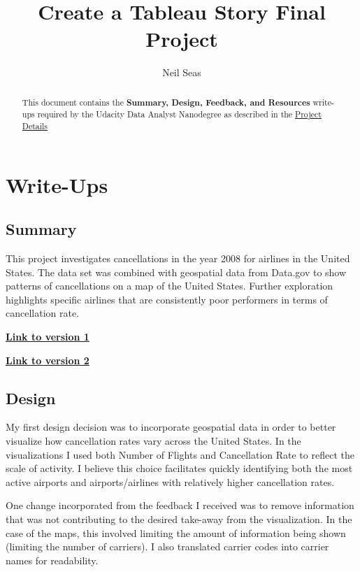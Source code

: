 \documentclass[a4paper,11pt]{report}
\title{Create a Tableau Story Final Project}
\author{Neil Seas}
\begin{document}
\maketitle
\tableofcontents

\begin{abstract}
This document contains the \textbf{Summary, Design, Feedback, and Resources}
write-ups required by the Udacity Data Analyst Nanodegree as described in the
    \href{https://classroom.udacity.com/nanodegrees/nd002/parts/38e740f3-bea2-43cb-a474-1de2abe3ec4b/modules/982dba08-fe94-413f-91ff-0dce5a6e1e16/lessons/9954c4f7-c621-4e22-baf4-60da1150093c/concepts/656b2cfc-9c83-4d19-931a-af681d43f92c}{Project
    Details}
\end{abstract}

\chapter{Write-Ups}
\section{Summary}
This project investigates cancellations in the year 2008 for airlines in the
United States. The data set was combined with geospatial data from Data.gov to
show patterns of cancellations on a map of the United States.  Further
exploration highlights specific airlines that are consistently poor performers
in terms of cancellation rate.

\href{https://public.tableau.com/profile/neil.seas#!/vizhome/UdacityFinalProject/Story1}{\bf{Link
to version 1}}

\href{https://public.tableau.com/profile/neil.seas#!/vizhome/UdacityFinalProjectv2/Story1}{\bf{Link
to version 2}}

\section{Design}
My first design decision was to incorporate geospatial data in order to better
visualize how cancellation rates vary across the United States.  In the
visualizations I used both Number of Flights and Cancellation Rate to reflect
the scale of activity.  I believe this choice facilitates quickly identifying
both the most active airports and airports/airlines with relatively higher
cancellation rates.

One change incorporated from the feedback I received was to remove information
that was not contributing to the desired take-away from the visualization.  In
the case of the maps, this involved limiting the amount of information being
shown (limiting the number of carriers).  I also translated carrier codes into
carrier names for readability.
\end{document}
